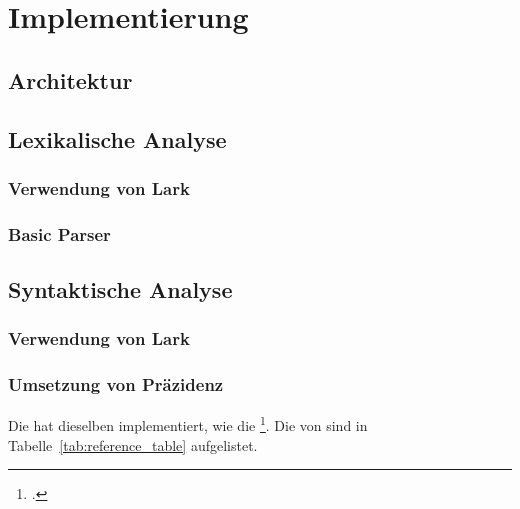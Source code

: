 
\chapter{Implementierung}
\label{ch:implementierung}
\section{Architektur}

\section{Lexikalische Analyse}
\subsection{Verwendung von Lark}
\subsection{Basic Parser}
\section{Syntaktische Analyse}
\subsection{Verwendung von Lark}
\subsection{Umsetzung von Präzidenz}
Die  hat dieselben  implementiert, wie die  \footcite{noauthor_c_nodate}. Die  von  sind in Tabelle~\ref{tab:reference_table} aufgelistet.

